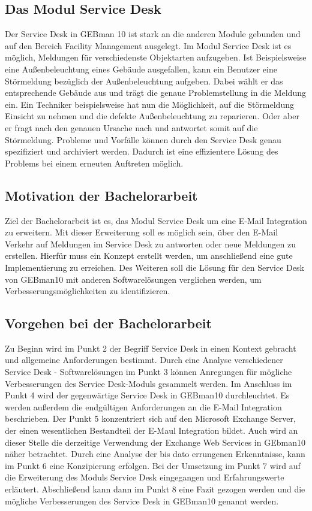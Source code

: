 \subsection{Das Modul Service Desk}
\noindent
Der Service Desk in GEBman 10 ist stark an die anderen Module gebunden und auf den Bereich Facility Management ausgelegt. Im Modul Service Desk ist es möglich, Meldungen für verschiedenste Objektarten aufzugeben. Ist Beispielsweise eine Außenbeleuchtung eines Gebäude ausgefallen, kann ein Benutzer eine Störmeldung bezüglich der Außenbeleuchtung aufgeben. Dabei wählt er das entsprechende Gebäude aus und trägt die genaue Problemstellung in die Meldung ein. Ein Techniker beispielsweise hat nun die Möglichkeit, auf die Störmeldung Einsicht zu nehmen und die defekte Außenbeleuchtung zu reparieren. Oder aber er fragt nach den genauen Ursache nach und antwortet somit auf die Störmeldung. Probleme und Vorfälle können durch den Service Desk genau spezifiziert und archiviert werden. Dadurch ist eine effizientere Lösung des Problems bei einem erneuten Auftreten möglich.


\subsection{Motivation der Bachelorarbeit}
\noindent
Ziel der Bachelorarbeit ist es, das Modul Service Desk um eine E-Mail Integration zu erweitern. Mit dieser Erweiterung soll es möglich sein, über den E-Mail Verkehr auf Meldungen im Service Desk zu antworten oder neue Meldungen zu erstellen. Hierfür muss ein Konzept erstellt werden, um anschließend eine gute Implementierung zu erreichen.\newline
Des Weiteren soll die Lösung für den Service Desk von GEBman10 mit anderen Softwarelösungen verglichen werden, um Verbesserungsmöglichkeiten zu identifizieren. 


\subsection{Vorgehen bei der Bachelorarbeit}
\noindent
Zu Beginn wird im Punkt 2 der Begriff Service Desk in einen Kontext gebracht und allgemeine Anforderungen bestimmt. Durch eine Analyse verschiedener Service Desk - Softwarelösungen im Punkt 3 können Anregungen für mögliche Verbesserungen des Service Desk-Moduls gesammelt werden. Im Anschluss im Punkt 4 wird der gegenwärtige Service Desk in GEBman10 durchleuchtet. Es werden außerdem die endgültigen Anforderungen an die E-Mail Integration beschrieben. Der Punkt 5 konzentriert sich auf den Microsoft Exchange Server, der einen wesentlichen Bestandteil der E-Maul Integration bildet. Auch wird an dieser Stelle die derzeitige Verwendung der Exchange Web Services in GEbman10 näher betrachtet.  Durch eine Analyse der bis dato errungenen Erkenntnisse, kann im Punkt 6 eine Konzipierung erfolgen. Bei der Umsetzung im Punkt 7 wird auf die Erweiterung des Moduls Service Desk eingegangen und Erfahrungswerte erläutert. Abschließend kann dann im Punkt 8 eine Fazit gezogen werden und die mögliche Verbesserungen des Service Desk in GEBman10 genannt werden.